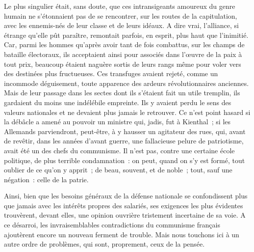 \documentclass[french,twoside]{book} %
\begin{document}
Le plus singulier était, sans doute, que ces intransigeants amoureux du genre humain ne s’étonnaient pas de se rencontrer, sur les routes de la capitulation, avec les ennemis-nés de leur classe et de leurs idéaux. A dire vrai, l’alliance, si étrange qu’elle pût paraître, remontait parfois, en esprit, plus haut que l’inimitié. Car, parmi les hommes qu’après avoir tant de fois combattus, sur les champs de bataille électoraux, ils acceptaient ainsi pour associés dans l’œuvre de la paix à tout prix, beaucoup étaient naguère sortis de leurs rangs même pour voler vers des destinées plus fructueuses. Ces transfuges avaient rejeté, comme un incommode déguisement, toute apparence des ardeurs révolutionnaires anciennes. Mais de leur passage dans les sectes dont ils s’étaient fait un utile tremplin, ils gardaient du moins une indélébile empreinte. Ils y avaient perdu le sens des valeurs nationales et ne devaient plus jamais le retrouver. Ce n’est point hasard si la débâcle a amené au pouvoir un ministre qui, jadis, fut à Kienthal ; si les Allemands parviendront, peut-être, à y hausser un agitateur des rues, qui, avant de revêtir, dans les années d’avant guerre, une fallacieuse pelure de patriotisme, avait été un des chefs du communisme. Il n’est pas, contre une certaine école politique, de plus terrible condamnation : on peut, quand on s’y est formé, tout oublier de ce qu’on y apprit ; de beau, souvent, et de noble ; tout, sauf une négation : celle de la patrie.\par
Ainsi, bien que les besoins généraux de la défense nationale se confondissent plus que jamais avec les intérêts propres des salariés, ses exigences les plus évidentes trouvèrent, devant elles, une opinion ouvrière tristement incertaine de sa voie. A ce désarroi, les invraisemblables contradictions du communisme français ajoutèrent encore un nouveau   ferment de trouble. Mais nous touchons ici à un autre ordre de problèmes, qui sont, proprement, ceux de la pensée.\par
\end{document}
